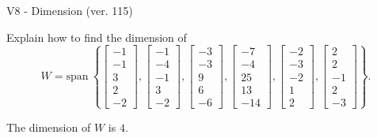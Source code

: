 \begin{exercise}
  \begin{exerciseTitle}V8 - Dimension (ver. 115)\end{exerciseTitle}
  \begin{exerciseStatement}
    Explain how to find the dimension of 
\[W=\mathrm{span}\ \left\{\left[\begin{array}{r}
-1 \\
-1 \\
3 \\
2 \\
-2
\end{array}\right] , \left[\begin{array}{r}
-1 \\
-4 \\
-1 \\
3 \\
-2
\end{array}\right] , \left[\begin{array}{r}
-3 \\
-3 \\
9 \\
6 \\
-6
\end{array}\right] , \left[\begin{array}{r}
-7 \\
-4 \\
25 \\
13 \\
-14
\end{array}\right] , \left[\begin{array}{r}
-2 \\
-3 \\
-2 \\
1 \\
2
\end{array}\right] , \left[\begin{array}{r}
2 \\
2 \\
-1 \\
2 \\
-3
\end{array}\right]\right\}.\]



  \end{exerciseStatement}
  \begin{exerciseAnswer}
   The dimension of \(W\) is  \(4\).
  


  \end{exerciseAnswer}
\end{exercise}